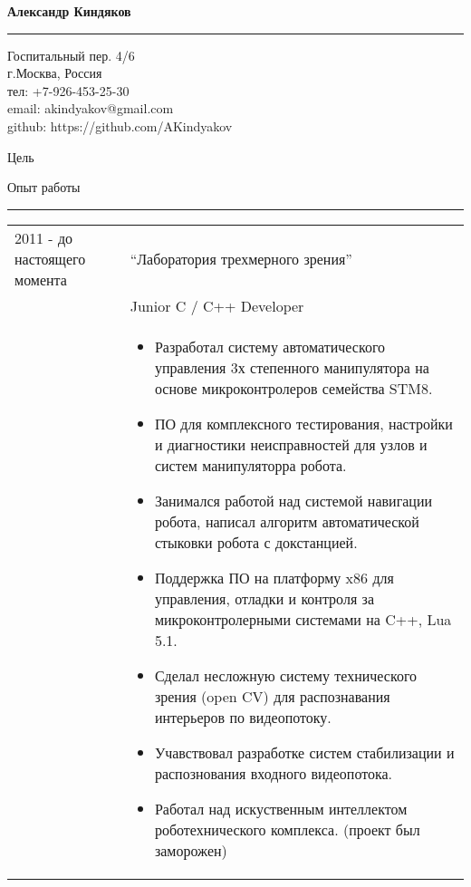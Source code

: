 \documentclass{article}
\begin{document}
{\Large\textbf{Александр Киндяков}}
\hrule \smallskip
\rule{0pt}{5mm}
{\itshape
    \begin{flushright}
    Госпитальный пер. 4/6 \\
    г.Москва, Россия \\
    тел: +7-926-453-25-30 \\
    email: akindyakov@gmail.com \\
    github: https://github.com/AKindyakov \\
    \end{flushright}
}

{\large Цель } \rule{0pt}{1cm}

{\large Опыт работы } \rule{0pt}{1cm}
\hrule \smallskip
    \begin{tabular}{p{25mm}|p{110mm}}
    2011 - до настоящего момента
        & ``Лаборатория трехмерного зрения'' \\
        & Junior C / C++ Developer \\
        &   \begin{itemize}
            \item Разработал систему автоматического управления 
                3х степенного манипулятора на основе микроконтролеров семейства STM8.
            \item ПО для комплексного тестирования, настройки и диагностики
                неисправностей для узлов и систем манипуляторра робота.
            \item Занимался работой над системой навигации робота,
                написал алгоритм автоматической стыковки робота с докстанцией.
            \item Поддержка ПО на платформу x86 для управления, 
                отладки и контроля за микроконтролерными системами на C++, Lua 5.1.
            \item Сделал несложную систему технического зрения (open CV) 
                для распознавания интерьеров по видеопотоку.
            \item Учавствовал разработке систем стабилизации и
                распознования входного видеопотока.
            \item Работал над искуственным интеллектом роботехнического комплекса.
                (проект был заморожен) 
            \end{itemize}
        \\
    \end{tabular}
\end{document}
